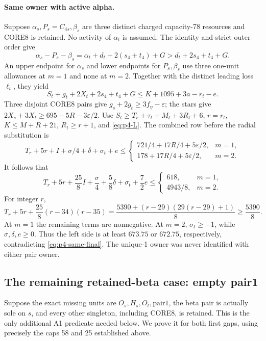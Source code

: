 \documentclass[11pt,letterpaper]{article}
\theoremstyle{definition}\newtheorem{definition}[theorem]{Definition}
\begin{document}
\paragraph{Same owner with active alpha.}
Suppose $\alpha_s,P_s=C_{4s},\beta_s$ are three distinct charged
capacity-78 resources and CORE8 is retained. No activity of $\alpha_t$
is assumed. The identity and strict outer order give
\[
 \alpha_s-P_s-\beta_s
 =\alpha_t+d_t+2(s_4+t_4)+G
 >d_t+2s_4+t_4+G.
\]
An upper endpoint for $\alpha_s$ and lower endpoints for $P_s,\beta_s$
use three one-unit allowances at $m=1$ and none at $m=2$.
Together with the distinct leading loss $\ell_t$, they yield
\begin{equation}
 S_t+g_t+2X_t+2s_4+t_4+G
 \le K+1095+3a-r_t-e.                            \label{eq:p4-same-transport}
\end{equation}
Three disjoint CORE8 pairs give $g_s+2g_t\ge3f_\eta-\varepsilon$;
the stars give $2X_s+3X_t\ge695-5R-3\varepsilon/2$.
Use $S_t\ge T_r+\tau_t+M_t+3R_t+6$, $r=r_t$,
$K\le M+R+21$, $R_t\ge r+1$, and \eqref{eq:p4-L}.
The combined row before the radial substitution is
\[
 T_r+5r+I+\sigma/4+\delta+\sigma_t+e
 \le \begin{cases}721/4+17R/4+5\varepsilon/2,&m=1,\\
                   178+17R/4+5\varepsilon/2,&m=2.
       \end{cases}
\]
It follows that
\begin{equation}
 T_r+5r+\frac{25}{8}I+\frac\sigma4+\frac58\delta
       +\sigma_t+\frac72e
 \le\begin{cases}618,&m=1,\\4943/8,&m=2.\end{cases}
                                                        \label{eq:p4-same-final}
\end{equation}
For integer $r$,
\[
 T_r+5r+\frac{25}{8}(r-34)(r-35)
 =\frac{5390+(r-29)(29(r-29)+1)}8\ge\frac{5390}{8}.
\]
At $m=1$ the remaining terms are nonnegative. At $m=2$,
$\sigma_t\ge-1$, while $\sigma,\delta,e\ge0$.
Thus the left side is at least $673.75$ or $672.75$, respectively,
contradicting \eqref{eq:p4-same-final}. The unique-1 owner was never
identified with either pair owner.

\subsection{The remaining retained-beta case: empty pair1}\label{subsec:p4-T5}
Suppose the exact missing units are $O_s,H_s,O_t,\mathrm{pair1}$,
the beta pair is actually sole on $s$, and every other singleton,
including CORE8, is retained. This is the only additional A1 predicate
needed below. We prove it for both first gaps, using precisely the
caps 58 and 25 established above.
\end{document}
